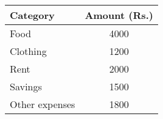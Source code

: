  \begin{tabular}{|l|c|}
        \hline
        \textbf{Category} & \textbf{Amount (Rs.)} \\
        \hline
        Food & 4000 \\
        Clothing & 1200 \\
        Rent & 2000 \\
        Savings & 1500 \\
        Other expenses & 1800 \\
        \hline
        \end{tabular}